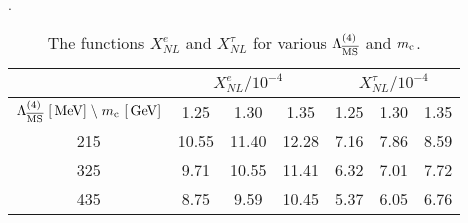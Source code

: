 \begin{table}[htb]
\caption[]{The functions $X^e_{NL}$ and $X^\tau_{NL}$
for various $\Lambda_{\overline{\rm MS}}^{(4)}$ and $m_{\rm c}$.
\label{tab:xnlnum}}.
\begin{center}
\begin{tabular}{|c|c|c|c|c|c|c|}
& \multicolumn{3}{c|}{$X^e_{NL}/10^{-4}$} &
  \multicolumn{3}{c|}{$X^\tau_{NL}/10^{-4}$} \\
\hline
$\Lms^{(4)}\ [\mev]\;\backslash\;\mc\ [\gev]$ &
1.25 & 1.30 & 1.35 & 1.25 & 1.30 & 1.35 \\
\hline
215 & 10.55  & 11.40  & 12.28 & 7.16 & 7.86 & 8.59 \\
325 &  9.71  & 10.55  & 11.41 & 6.32 & 7.01 & 7.72 \\
435 &  8.75  &  9.59  & 10.45 & 5.37 & 6.05 & 6.76
\end{tabular}
\end{center}
\end{table}

